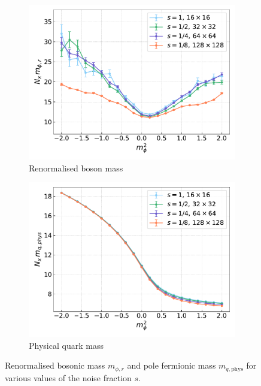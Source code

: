 \begin{figure}[h!]
    \begin{subfigure}{0.47\textwidth}
        \includegraphics[width=\textwidth]{figures/cooling/mass_scan/mphir.pdf}
        \caption{Renormalised boson mass}
    \end{subfigure}
    \hfill 
    \begin{subfigure}{0.47\textwidth}
        \includegraphics[width=\textwidth]{figures/cooling/mass_scan/mqphys.pdf}
        \caption{Physical quark mass}
    \end{subfigure}
    \caption[Masses in the cooling procedure]{Renormalised bosonic mass $m_{\phi, r}$ and pole fermionic mass $m_{q,\text{phys}}$ for various values of the noise fraction $s$.}
    \label{fig:cooling_masses}
\end{figure}
